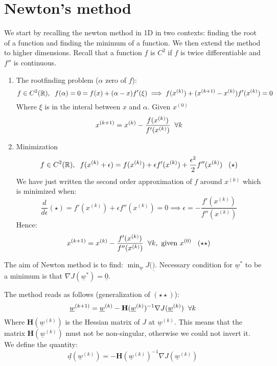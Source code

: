 \section{Newton's method}
We start by recalling the newton method in 1D in two contexts: finding the root of a function and finding the minimum of a function. We then extend the method to higher dimensions. Recall that a function $f$ is $C^2$ if $f$ is twice differentiable and $f''$ is continuous.
\begin{enumerate}
    \item The rootfinding problem ($\alpha$ zero of $f$):
    \[
        f \in C^2(\mathbb{R}), \hspace{0.2cm} f(\alpha) = 0 = f(x)  + (\alpha - x)f'(\xi) \implies f(x^{(k)}) + (x^{(k+1)} - x^{(k)})f'(x^{(k)}) = 0    
    \]
    Where $\xi$ is in the interal between $x$ and $\alpha$. Given $x^{(0)}$
    \[
        x^{(k+1)} = x^{(k)} - \frac{f(x^{(k)})}{f'(x^{(k)})} \hspace{0.2cm} \forall k
    \]
    \item Minimization
    \[
        f \in C^2(\mathbb{R}), \hspace{0.2cm} f(x^{(k)} + \epsilon) = f(x^{(k)}) + \epsilon f'(x^{(k)}) + \frac{\epsilon^2}{2}f''(x^{(k)}) \hspace{0.3cm} (\star)
    \]
    We have just written the second order approximation of $f$ around $x^{(k)}$ which is minimized when:
    \[
        \dfrac{d}{d\epsilon}(\star) = f'(x^{(k)}) + \epsilon f''(x^{(k)}) = 0 \implies \epsilon = -\frac{f'(x^{(k)})}{f''(x^{(k)})}
    \]
    Hence:
    \[
        x^{(k+1)} = x^{(k)} - \frac{f'(x^{(k)})}{f''(x^{(k)})} \hspace{0.2cm} \forall k, \text{ given } x^{(0)} \hspace{0.3cm} (\star\star)    
    \]
\end{enumerate}

The aim of Newton method is to find: $\min_{\underline{w}} J(\underline)$. Necessary condition for $\underline{w}^*$ to be a minimum is that $\nabla J(\underline{w}^*) = \underline{0}$. 

The method reads as follows (generalization of $(\star\star)$):
\[
    \underline{w}^{(k+1)} = \underline{w}^{(k)} - \mathbf{H} (\underline{w}^{(k)})^{-1}\nabla J(\underline{w}^{(k)}) \hspace{0.2cm} \forall k
\]
Where $\mathbf{H} (\underline{w}^{(k)})$ is the Hessian matrix of $J$ at $\underline{w}^{(k)}$. This means that the matrix $\mathbf{H} (\underline{w}^{(k)})$ must not be non-singular, otherwise we could not invert it. We define the quantity:
\[
    \underline{d}(\underline{w}^{(k)}) = - \mathbf{H} (\underline{w}^{(k)})^{-1}\nabla J(\underline{w}^{(k)})
\]

